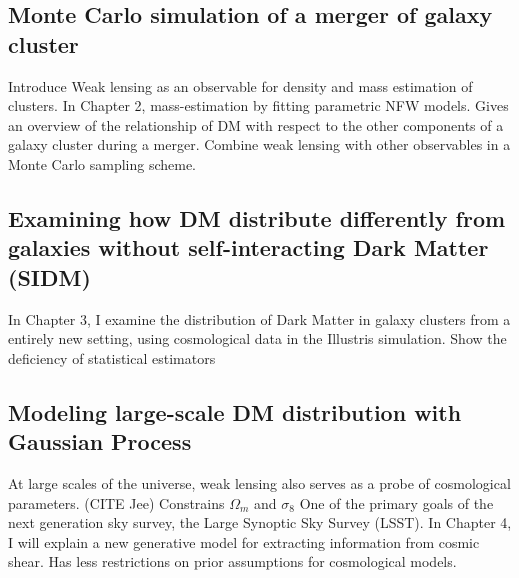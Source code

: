 \documentclass[ucdthesis.tex]{subfiles}
\begin{document}
		\subsection{Monte Carlo simulation of a merger of galaxy cluster}
		Introduce Weak lensing as an observable for density and mass estimation of
		clusters. In Chapter 2, mass-estimation by fitting parametric NFW models. 
		Gives an overview of the relationship of DM with respect to the other
		components of a galaxy cluster during a merger. Combine weak lensing with
		other observables in a Monte Carlo sampling scheme.

		\subsection{Examining how DM distribute differently from galaxies without 
		self-interacting Dark Matter (SIDM)}
		In Chapter 3, I examine the distribution of Dark Matter in galaxy clusters
		from a entirely new setting, using cosmological data in the Illustris
		simulation. Show the deficiency of statistical estimators 

		\subsection{Modeling large-scale DM distribution with Gaussian Process}
		At large scales of the universe, weak lensing also serves as a probe of 
		cosmological parameters.  (CITE Jee)
		Constrains $\Omega_m$ and $\sigma_8$ 
		One of the primary goals of the next generation sky survey, the Large
		Synoptic Sky Survey (LSST). In Chapter 4, I will explain a new generative
		model for extracting information from cosmic shear. 
	  Has less restrictions on prior assumptions for cosmological models.	


		{\singlespacing        
		{}
		}
\end{document}
